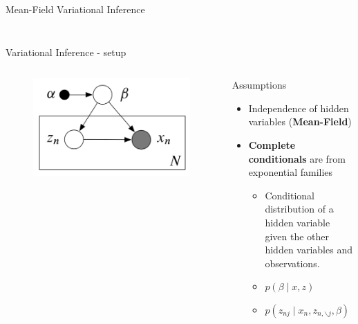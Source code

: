 \documentclass[aspectratio=169]{beamer}
\begin{document}
\begin{frame}{Mean-Field Variational Inference}
\begin{columns}
\begin{column}{0.48\textwidth}
\begin{figure}
        \end{figure}
    \end{column}
    \end{columns}
\end{frame}

\begin{frame}{Variational Inference - setup}
    
    \begin{columns}
    \begin{column}{0.48\textwidth}
        \begin{figure}
        \includegraphics[width=\textwidth]{setup.png}\hspace*{12cm}
        \end{figure}
    \end{column}
    \begin{column}{0.48\textwidth}
        \begin{block}{Assumptions}
        \begin{itemize}
            \item Independence of hidden variables (\textbf{Mean-Field})
            \item \textbf{Complete conditionals} are from exponential families\\
            \begin{itemize}
                \item Conditional distribution of a hidden variable given the other hidden variables and observations.
                \item $p(\beta \mid x,z)$
                \item $p(z_{nj} \mid x_n, z_{n,\backslash j},\beta)$
            \end{itemize}
        \end{itemize}
        \end{block}
    \end{column}
    \end{columns}
\end{frame}
\end{document}
